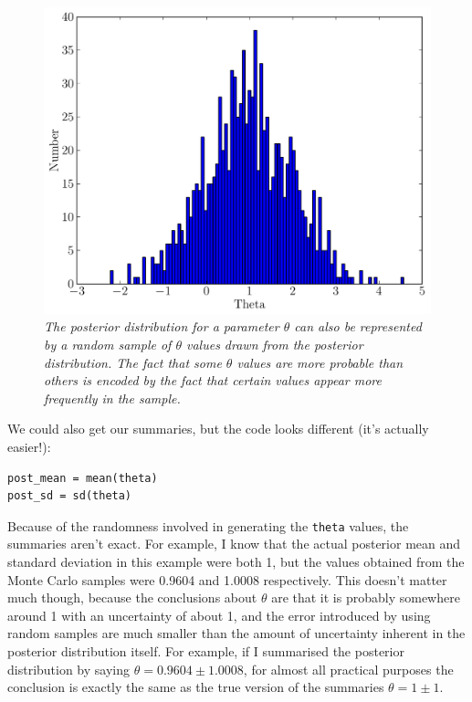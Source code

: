 \begin{figure}[ht!]
\begin{center}
\includegraphics[scale=0.5]{Figures/normal2.pdf}
\caption{\it The posterior distribution for a parameter $\theta$ can also be
represented by a random sample of $\theta$ values drawn from the posterior
distribution. The fact that some $\theta$ values are more probable than others
is encoded by the fact that certain values appear more frequently in the sample.
\label{fig:normal2}}
\end{center}
\end{figure}

We could also get our summaries, but the code looks different
(it's actually easier!):
\begin{verbatim}
post_mean = mean(theta)
post_sd = sd(theta)
\end{verbatim}
Because of the randomness involved in generating the {\tt theta} values,
the summaries aren't exact. For example, I know that the actual posterior mean
and standard deviation in this example were both 1, but the values obtained
from the Monte Carlo samples were 0.9604 and 1.0008 respectively. This doesn't
matter much though, because the conclusions about $\theta$ are that it is probably
somewhere around 1 with an uncertainty of about 1, and the error introduced by
using random samples are much smaller than the amount of uncertainty inherent
in the posterior distribution itself. For example, if I summarised the posterior
distribution by saying $\theta = 0.9604 \pm 1.0008$, for almost all practical
purposes the conclusion is exactly the same as the true version of the summaries
$\theta = 1 \pm 1$.

